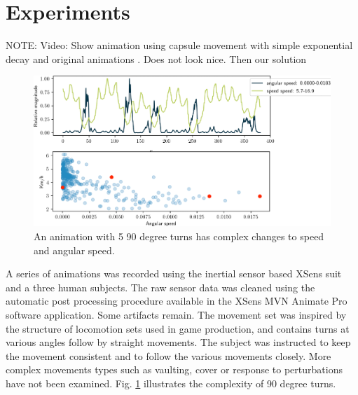 \section{Experiments}

NOTE: Video: Show animation using capsule movement with simple exponential decay and original animations . Does not look nice. Then our solution
\begin{figure}
    \centering
    \includegraphics[width=1.0\columnwidth]{img/movement_stats.png}
    \caption{An animation with 5 90 degree turns has complex changes to speed and angular speed.}
    \label{fig:results:trajectory_estimation}
\end{figure}

A series of animations was recorded using the inertial sensor based XSens suit and a three human subjects. The raw sensor data was cleaned using the automatic post processing procedure available in the XSens MVN Animate Pro software application. Some artifacts remain.
The movement set was inspired by the structure of locomotion sets used in game production, and contains turns at various angles follow by straight movements. The subject was instructed to keep the movement consistent and to follow the various movements closely. More complex movements types such as vaulting, cover or response to perturbations have not been examined. Fig. \ref{fig:results:trajectory_estimation} illustrates the complexity of 90 degree turns. 

